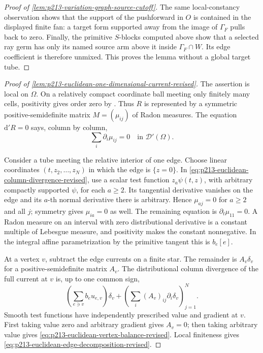 \begin{proof}[Proof of
\cref{lem:p213-variation-graph-source-cutoff}]
The same local-constancy observation shows that the support of the
pushforward in $O$ is contained in the displayed finite fan: a target
form supported away from the image of $\Gamma_F$ pulls back to zero.
Finally, the primitive $S$-blocks computed above show that a selected ray
germ has only its named source arm above it inside
$\Gamma_F\cap W$.  Its edge coefficient is therefore unmixed.  This
proves the lemma without a global target tube.
\end{proof}

\begin{proof}[Proof of
\cref{lem:p213-euclidean-one-dimensional-current-revised}]
The assertion is local on $\Omega$.  On a relatively compact coordinate
ball meeting only finitely many cells, positivity gives order zero by
\cite[Proposition~7.2.9]{CLD25}.  Thus $R$ is represented by a symmetric
positive-semidefinite matrix $M=(\mu_{ij})$ of Radon measures.  The
equation $\mathrm d'R=0$ says, column by column,
\begin{equation}
                         \sum_i\partial_i\mu_{ij}=0
                 \quad\text{in }\mathcal D'(\Omega).
\label{eq:p213-euclidean-column-divergence-revised}
\end{equation}

Consider a tube meeting the relative interior of one edge.  Choose linear
coordinates $(t,z_2,\ldots,z_N)$ in which the edge is $\{z=0\}$.  In
\eqref{eq:p213-euclidean-column-divergence-revised}, use a scalar test
function $z_a\psi(t,z)$, with arbitrary compactly supported $\psi$, for
each $a\geq2$.  Its tangential derivative vanishes on the edge and its
$a$-th normal derivative there is arbitrary.  Hence
$\mu_{aj}=0$ for $a\geq2$ and all $j$; symmetry gives
$\mu_{ia}=0$ as well.  The remaining equation is
$\partial_t\mu_{11}=0$.  A Radon measure on an interval with zero
distributional derivative is a constant multiple of Lebesgue measure,
and positivity makes the constant nonnegative.  In the integral affine
parametrization by the primitive tangent this is $b_e[e]$.

At a vertex $v$, subtract the edge currents on a finite star.  The
remainder is $A_v\delta_v$ for a positive-semidefinite matrix $A_v$.
The distributional column divergence of the full current at $v$ is, up to
one common sign,
\begin{equation}
 \left(\sum_{e\ni v}b_eu_{e,v}\right)\delta_v
       +\left(\sum_i(A_v)_{ij}\partial_i\delta_v\right)_{j=1}^N.
\label{eq:p213-euclidean-vertex-distribution-revised}
\end{equation}
Smooth test functions have independently prescribed value and gradient at
$v$.  First taking value zero and arbitrary gradient gives $A_v=0$;
then taking arbitrary value gives
\eqref{eq:p213-euclidean-vertex-balance-revised}.  Local finiteness gives
\eqref{eq:p213-euclidean-edge-decomposition-revised}.
\end{proof}

